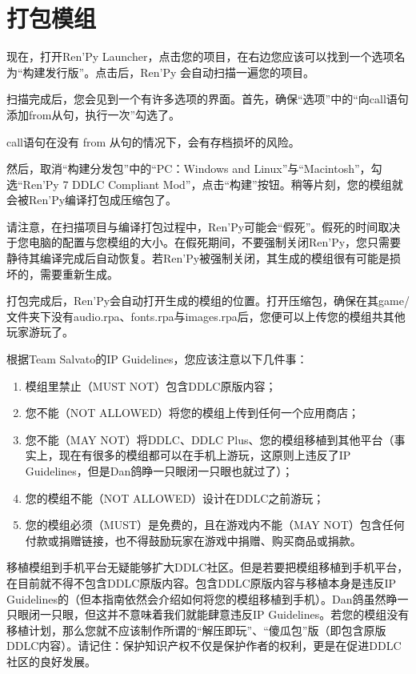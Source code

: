 \section{打包模组}
现在，打开Ren'Py Launcher，点击您的项目，在右边您应该可以找到一个选项名为“构建发行版”。点击后，Ren'Py 会自动扫描一遍您的项目。

扫描完成后，您会见到一个有许多选项的界面。首先，确保“选项”中的“向call语句添加from从句，执行一次”勾选了。
\begin{Warning}
    call语句在没有 from 从句的情况下，会有存档损坏的风险。
\end{Warning}
然后，取消“构建分发包”中的“PC：Windows and Linux”与“Macintosh”，勾选“Ren'Py 7 DDLC Compliant Mod”，点击“构建”按钮。稍等片刻，您的模组就会被Ren'Py编译打包成压缩包了。
\begin{Warning}
    请注意，在扫描项目与编译打包过程中，Ren'Py可能会“假死”。假死的时间取决于您电脑的配置与您模组的大小。在假死期间，不要强制关闭Ren'Py，您只需要静待其编译完成后自动恢复。若Ren'Py被强制关闭，其生成的模组很有可能是损坏的，需要重新生成。
\end{Warning}

打包完成后，Ren'Py会自动打开生成的模组的位置。打开压缩包，确保在其game/文件夹下没有audio.rpa、fonts.rpa与images.rpa后，您便可以上传您的模组共其他玩家游玩了。

\begin{Attention}
    根据Team Salvato的IP Guidelines，您应该注意以下几件事：
    \begin{enumerate}
        \item 模组里禁止（MUST NOT）包含DDLC原版内容；
        \item 您不能（NOT ALLOWED）将您的模组上传到任何一个应用商店；
        \item 您不能（MAY NOT）将DDLC、DDLC Plus、您的模组移植到其他平台（事实上，现在有很多的模组都可以在手机上游玩，这原则上违反了IP Guidelines，但是Dan鸽睁一只眼闭一只眼也就过了）；
        \item 您的模组不能（NOT ALLOWED）设计在DDLC之前游玩；
        \item 您的模组必须（MUST）是免费的，且在游戏内不能（MAY NOT）包含任何付款或捐赠链接，也不得鼓励玩家在游戏中捐赠、购买商品或捐款。
    \end{enumerate}
    移植模组到手机平台无疑能够扩大DDLC社区。但是若要把模组移植到手机平台，在目前就不得不包含DDLC原版内容。包含DDLC原版内容与移植本身是违反IP Guidelines的（但本指南依然会介绍如何将您的模组移植到手机）。Dan鸽虽然睁一只眼闭一只眼，但这并不意味着我们就能肆意违反IP Guidelines。若您的模组没有移植计划，那么您就不应该制作所谓的“解压即玩”、“傻瓜包”版（即包含原版DDLC内容）。请记住：保护知识产权不仅是保护作者的权利，更是在促进DDLC社区的良好发展。
\end{Attention}